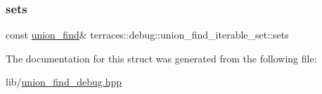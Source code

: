 \mbox{\label{structterraces_1_1debug_1_1union__find__iterable__set_aa14c4d14c3fd1ab5caad38c37457457c}} 
\subsubsection{\texorpdfstring{sets}{sets}}
{\footnotesize\ttfamily const \hyperlink{classterraces_1_1union__find}{union\+\_\+find}\& terraces\+::debug\+::union\+\_\+find\+\_\+iterable\+\_\+set\+::sets}



The documentation for this struct was generated from the following file\+:\begin{DoxyCompactItemize}
\item 
lib/\hyperlink{union__find__debug_8hpp}{union\+\_\+find\+\_\+debug.\+hpp}\end{DoxyCompactItemize}
